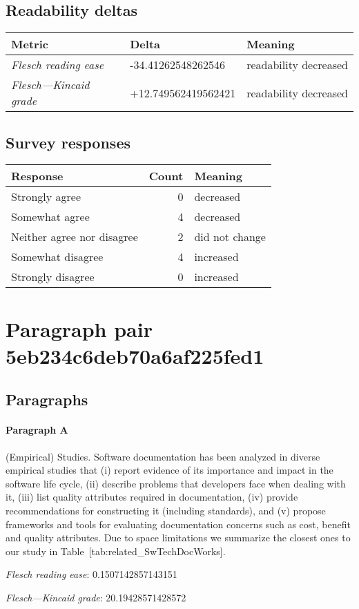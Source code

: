 \subsection{Readability deltas}

\begin{tabular}{lll}
\toprule
               \textbf{Metric} &       \textbf{Delta} &       \textbf{Meaning} \\
\midrule
    \emph{Flesch reading ease} &   -34.41262548262546 &  readability decreased \\
 \emph{Flesch---Kincaid grade} &  +12.749562419562421 &  readability decreased \\
\bottomrule
\end{tabular}

\subsection{Survey responses}
\begin{tabular}{lrl}
\toprule
          \textbf{Response} &  \textbf{Count} & \textbf{Meaning} \\
\midrule
             Strongly agree &               0 &        decreased \\
             Somewhat agree &               4 &        decreased \\
 Neither agree nor disagree &               2 &   did not change \\
          Somewhat disagree &               4 &        increased \\
          Strongly disagree &               0 &        increased \\
\bottomrule
\end{tabular}

\section{Paragraph pair 5eb234c6deb70a6af225fed1}
\subsection{Paragraphs}
\paragraph{Paragraph A}
(Empirical) Studies. Software documentation has been analyzed in diverse empirical studies that (i) report evidence of its importance and impact in the software life cycle, (ii) describe problems that developers face when dealing with it, (iii) list quality attributes required in documentation, (iv) provide recommendations for constructing it (including standards), and (v) propose frameworks and tools for evaluating documentation concerns such as cost, benefit and quality attributes. Due to space limitations we summarize the closest ones to our study in Table [tab:related\_SwTechDocWorks].\par\medskip\emph{Flesch reading ease}: 0.1507142857143151\par\emph{Flesch---Kincaid grade}: 20.19428571428572

